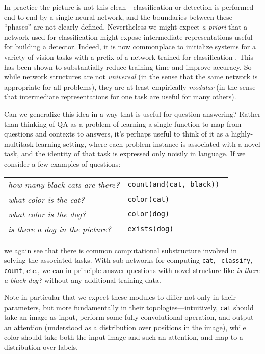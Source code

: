 \documentclass{article} %
\theoremstyle{definition}
\theoremstyle{example}
\begin{document}
In practice the picture is not this clean---classification or detection is
performed end-to-end by a single neural network, and the boundaries between
these ``phases'' are not clearly defined. Nevertheless we might expect \textit{a
priori} that a network used for classification might expose intermediate
representations useful for building a detector. Indeed, it is now commonplace to
initialize systems for a variety of vision tasks with a prefix of a network
trained for classification \cite{Long14FullyConvolutional}. This has been shown
to substantially reduce training time and improve accuracy. So while network
structures are not \emph{universal} (in the sense that the same network is
appropriate for all problems), they are at least empirically \emph{modular} (in
the sense that intermediate representations for one task are useful for many
others). 

Can we generalize this idea in a way that is useful for question answering?
Rather than thinking of QA as a problem of learning a single function to map
from questions and contexts to answers, it's perhaps useful to think of it as a
highly-multitask learning setting, where each problem instance is associated
with a novel task, and the identity of that task is expressed only noisily in
language. If we consider a few examples of questions:
\begin{center}
  \begin{tabular}{ll}
    {\it how many black cats are there?} & \tt count(and(cat, black)) \\
    {\it what color is the cat?} & \tt color(cat) \\
    {\it what color is the dog?} & \tt color(dog) \\
    {\it is there a dog in the picture?} & \tt exists(dog)
  \end{tabular}
\end{center}
we again see that there is common computational substructure involved in solving
the associated tasks.  With sub-networks for computing {\tt cat}, {\tt
classify}, {\tt count}, etc., we can in principle answer questions with novel
structure like {\it is there a black dog?} without any additional training data.

Note in particular that we expect these modules to differ not only in their
parameters, but more fundamentally in their topologies---intuitively, {\tt cat}
should take an image as input, perform some fully-convolutional operation, and
output an attention (understood as a distribution over positions in the image),
while color should take both the input image and such an attention, and map to a
distribution over labels.
\end{document}
